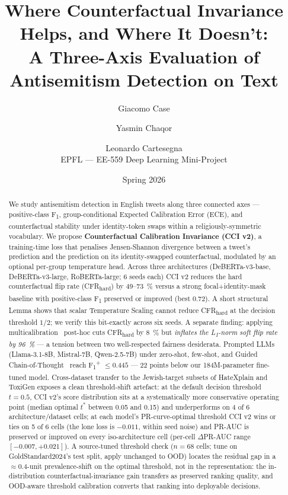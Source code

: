 \documentclass[10pt,a4paper]{article}
\title{Where Counterfactual Invariance Helps, and Where It Doesn't:\\
A Three-Axis Evaluation of Antisemitism Detection on Text}
\author{Giacomo Case \and Yasmin Chaqor \and Leonardo Cartesegna\\
EPFL --- EE-559 Deep Learning Mini-Project}
\date{Spring 2026}
\begin{document}
\maketitle

\begin{abstract}
We study antisemitism detection in English tweets along three connected axes
--- positive-class F\textsubscript{1}, group-conditional Expected Calibration
Error (ECE), and counterfactual stability under identity-token swaps within a
religiously-symmetric vocabulary. We propose \textbf{Counterfactual Calibration
Invariance (CCI v2)}, a training-time loss that penalises Jensen-Shannon
divergence between a tweet's prediction and the prediction on its identity-swapped
counterfactual, modulated by an optional per-group temperature head. Across three
architectures (DeBERTa-v3-base, DeBERTa-v3-large, RoBERTa-large; 6 seeds each)
CCI v2 reduces the hard counterfactual flip rate (CFR\textsubscript{hard}) by
49--73~\% versus a strong focal+identity-mask baseline with positive-class
F\textsubscript{1} preserved or improved (best 0.72). A short structural Lemma
shows that scalar Temperature Scaling cannot reduce CFR\textsubscript{hard} at
the decision threshold $1/2$; we verify this bit-exactly across six seeds.
A separate finding: applying multicalibration~\citep{hebertjohnson2018multicalibration}
post-hoc cuts CFR\textsubscript{hard} by 8~\% but \emph{inflates the
L\textsubscript{1}-norm soft flip rate by 96~\%} --- a tension between two
well-respected fairness desiderata. Prompted LLMs (Llama-3.1-8B, Mistral-7B,
Qwen-2.5-7B) under zero-shot, few-shot, and Guided
Chain-of-Thought~\citep{patel2025evaluating} reach F\textsubscript{1}\textsuperscript{+}
$\le 0.445$ --- 22 points below our 184M-parameter fine-tuned model.
Cross-dataset transfer to the Jewish-target subsets of HateXplain and
ToxiGen exposes a clean threshold-shift artefact: at the default decision
threshold $t{=}0.5$, CCI v2's score distribution sits at a systematically
more conservative operating point (median optimal $t^*$ between 0.05 and 0.15)
and underperforms on 4 of 6 architecture/dataset cells; at each model's
PR-curve-optimal threshold CCI v2 wins or ties on 5 of 6 cells (the lone
loss is $-0.011$, within seed noise) and PR-AUC is preserved or improved
on every iso-architecture cell (per-cell $\Delta$PR-AUC range $[-0.007, +0.021]$).
A source-tuned threshold check ($n{=}68$ cells; tune on
GoldStandard2024's test split, apply unchanged to OOD) locates the residual
gap in a $\approx 0.4$-unit prevalence-shift on the optimal threshold,
not in the representation: the in-distribution counterfactual-invariance
gain transfers as preserved ranking quality, and OOD-aware threshold
calibration converts that ranking into deployable decisions.
\end{abstract}
\end{document}
